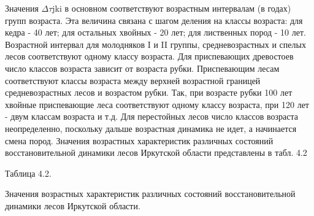\documentclass{report}
\begin{document}
Значения $\Delta $$\tau $jki в основном соответствуют возрастным интервалам (в годах) групп возраста. Эта величина
связана с шагом деления на  классы возраста: для кедра - 40 лет; для остальных хвойных - 20  лет; для лиственных пород
- 10 лет. Возрастной интервал для молодняков I и II группы, средневозрастных и спелых лесов  соответствуют одному
классу возраста. Для приспевающих древостоев число классов возраста зависит от возраста рубки. Приспевающим лесам
соответствуют классы возраста между верхней возрастной границей средневозрастных лесов и возрастом рубки. Так, при
возрасте рубки 100 лет хвойные приспевающие леса соответствуют одному классу возраста, при 120 лет - двум классам
возраста и т.д. Для перестойных лесов число классов возраста неопределенно, поскольку дальше возрастная динамика  не 
идет, а начинается смена пород. Значения возрастных характеристик различных состояний восстановительной динамики лесов
Иркутской области представлены в табл. 4.2

Таблица 4.2.

Значения возрастных характеристик различных состояний восстановительной динамики лесов Иркутской области.
\end{document}

